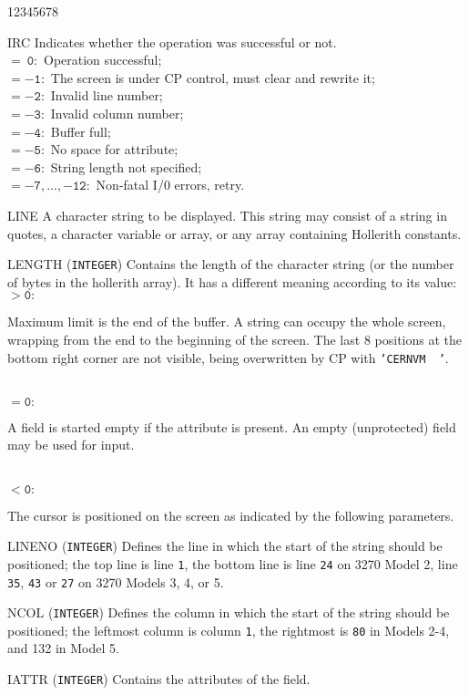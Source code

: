 \begin{DLtt}{12345678}
\item[IRC] Indicates whether the operation was successful or not. \\
$\mathtt{= \ 0:}$  Operation successful; \\
$\mathtt{= -1:}$ The screen is under CP control, must clear and rewrite
it;\\
$\mathtt{= -2:}$  Invalid line number; \\
$\mathtt{= -3:}$  Invalid column number; \\
$\mathtt{= -4:}$  Buffer full; \\
$\mathtt{= -5:}$  No space for attribute; \\
$\mathtt{= -6:}$  String length not specified; \\
$\mathtt{= -7,...,-12:}$  Non-fatal I/0 errors, retry.
\item [LINE] A character string to be displayed. This string may consist
of a string in quotes, a character variable or array, or any array
containing Hollerith constants.
\item [LENGTH] ({\tt INTEGER}) Contains the length of the character
string (or the number of bytes in the hollerith array).
It has a different meaning according to its value: \\
$\mathtt{> 0:}$  \parbox[t]{138mm}
{Maximum limit is the end of the buffer.
A string can occupy the whole screen, wrapping from the end to the
beginning of the screen.  The last 8 positions at the bottom right
corner are not visible, being overwritten by CP with
{\tt 'CERNVM\ \ '}.} \\
$\mathtt{= 0:}$ \parbox[t]{138mm}
{A field is started empty if the attribute is present.  An empty
(unprotected) field may be used for input.} \\
$\mathtt{< 0:}$ \parbox[t]{138mm}
{The cursor is positioned on the screen as indicated by the following
parameters.}
\item [LINENO] ({\tt INTEGER}) Defines the line in which the start
of the string should be positioned; the top line is line {\tt 1},
the bottom line is line {\tt 24} on 3270 Model 2,
line {\tt 35}, {\tt 43} or {\tt 27} on 3270 Models 3, 4, or 5.
\item [NCOL] ({\tt INTEGER}) Defines the column in which the start
of the string should be positioned; the leftmost column is column
{\tt 1}, the rightmost is {\tt 80} in Models 2-4, and 132 in Model 5.
\item [IATTR] ({\tt INTEGER}) Contains the attributes of the field.

\end{DLtt}
